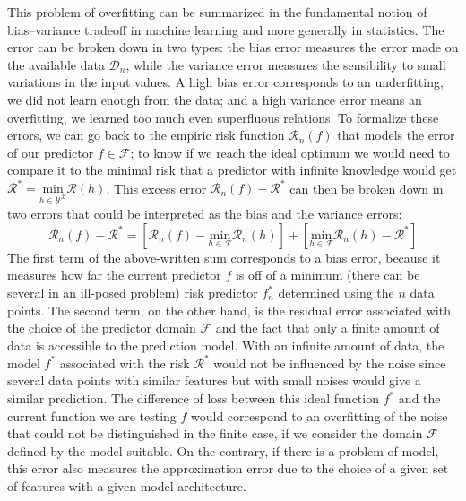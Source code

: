 \documentclass[main]{subfiles}
\begin{document}
This problem of overfitting can be summarized in the fundamental notion of bias--variance tradeoff in machine learning and more generally in statistics. The error can be broken down in two types: the bias error measures the error made on the available data $\mathcal{D}_n$, while the variance error measures the sensibility to small variations in the input values. A high bias error corresponds to an underfitting, we did not learn enough from the data; and a high variance error means an overfitting, we learned too much even superfluous relations. To formalize these errors, we can go back to the empiric risk function $\mathcal{R}_n(f)$ that models the error of our predictor $f\in\mathcal{F}$; to know if we reach the ideal optimum we would need to compare it to the minimal risk that a predictor with infinite knowledge would get $\mathcal{R}^* = \underset{\scriptscriptstyle h\in\mathcal{Y}^{\mathcal{X}}} {\text{min}}\mathcal{R}(h)$. This excess error $\mathcal{R}_n(f)-\mathcal{R}^*$ can then be broken down in two errors that could be interpreted as the bias and the variance errors:
\begin{equation}\label{eq:generalization_error}
  \mathcal{R}_n(f)-\mathcal{R}^* = \left[\mathcal{R}_n(f) - \underset{\scriptstyle h\in\mathcal{F}} {\text{min}}\mathcal{R}_n(h)\right] + \left[\underset{\scriptstyle h\in\mathcal{F}} {\text{min}}\mathcal{R}_n(h) -\mathcal{R}^*\right]
\end{equation}
The first term of the above-written sum corresponds to a bias error, because it measures how far the current predictor $f$ is off of a minimum (there can be several in an ill-posed problem) risk predictor $f_n^*$ determined using the $n$ data points. The second term, on the other hand, is the residual error associated with the choice of the predictor domain $\mathcal{F}$ and the fact that only a finite amount of data is accessible to the prediction model. With an infinite amount of data, the model $f^*$ associated with the risk $\mathcal{R}^*$ would not be influenced by the noise since several data points with similar features but with small noises would give a similar prediction. The difference of loss between this ideal function $f^*$ and the current function we are testing $f$ would correspond to an overfitting of the noise that could not be distinguished in the finite case, if we consider the domain $\mathcal{F}$ defined by the model suitable. On the contrary, if there is a problem of model, this error also measures the approximation error due to the choice of a given set of features with a given model architecture.
\end{document}
